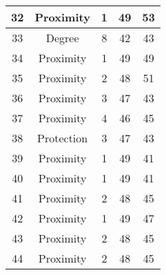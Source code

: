 \documentclass[results.tex]{subfiles}
\begin{document}
\begin{center}
\begin{tabular}{| c || c | c | c | c |}
            \hline
            32                      & Proximity                    & 1                      & 49                      & 53                   \\
            \hline
            33                      & Degree                       & 8                      & 42                      & 43                   \\
            \hline
            34                      & Proximity                    & 1                      & 49                      & 49                   \\
            \hline
            35                      & Proximity                    & 2                      & 48                      & 51                   \\
            \hline
            36                      & Proximity                    & 3                      & 47                      & 43                   \\
            \hline
            37                      & Proximity                    & 4                      & 46                      & 45                   \\
            \hline
            38                      & Protection                   & 3                      & 47                      & 43                   \\
            \hline
            39                      & Proximity                    & 1                      & 49                      & 41                   \\
            \hline
            40                      & Proximity                    & 1                      & 49                      & 41                   \\
            \hline
            41                      & Proximity                    & 2                      & 48                      & 45                   \\
            \hline
            42                      & Proximity                    & 1                      & 49                      & 47                   \\
            \hline
            43                      & Proximity                    & 2                      & 48                      & 45                   \\
            \hline
            44                      & Proximity                    & 2                      & 48                      & 45                   \\

\end{tabular}
\end{center}
\end{document}
